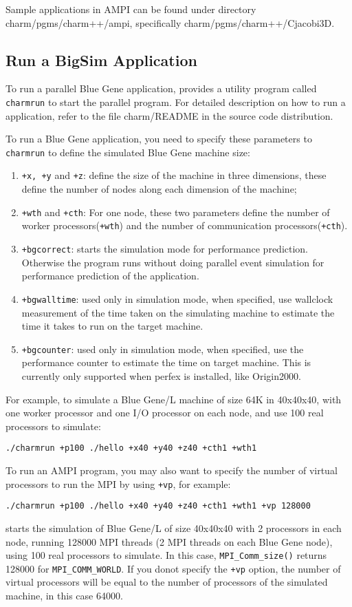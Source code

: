 Sample applications in AMPI can be found under directory
charm/pgms/charm++/ampi, specifically charm/pgms/charm++/Cjacobi3D.

\subsection{Run a BigSim Application}

To run a parallel Blue Gene application, \charmpp{} provides a utility program
called {\tt charmrun} to start the parallel program. 
For detailed description on how to run a \charmpp{} application, 
refer to the file charm/README in the source code distribution.

To run a Blue Gene application, you need to specify these parameters to 
{\tt charmrun} to define the simulated Blue Gene machine size:
\begin{enumerate}
\item {\tt +x, +y} and {\tt +z}:  define the size of the machine in three dimensions, these define the number of nodes along each dimension of the machine;
\item {\tt +wth} and {\tt +cth}:  For one node, these two parameters define the number of worker processors({\tt +wth}) and the number of communication processors({\tt +cth}).
\item {\tt +bgcorrect}: starts the simulation mode for performance prediction. Otherwise the program runs without doing parallel event simulation for performance prediction of the application.
\item {\tt +bgwalltime}: used only in simulation mode, when specified, use wallclock measurement of the time taken on the simulating machine to estimate the time it takes to run on the target machine.
\item {\tt +bgcounter}:  used only in simulation mode, when specified, use the performance counter to estimate the time on target machine. This is currently only supported when perfex is installed, like Origin2000.
\end{enumerate}

For example, to simulate a Blue Gene/L machine of size 64K in 40x40x40, with 
one worker processor and one I/O processor on each node, and use 100 
real processors to simulate:
\begin{verbatim}
./charmrun +p100 ./hello +x40 +y40 +z40 +cth1 +wth1
\end{verbatim}

To run an AMPI program, you may also want to specify the number of virtual 
processors to run the MPI by using {\tt +vp}, for example:
\begin{verbatim}
./charmrun +p100 ./hello +x40 +y40 +z40 +cth1 +wth1 +vp 128000
\end{verbatim}
starts the simulation of Blue Gene/L of size 40x40x40 with 2 processors 
in each node, running 128000 MPI threads (2 MPI threads on each Blue Gene node),
 using 100 real processors to simulate. In this case, {\tt MPI\_Comm\_size()}
returns 128000 for {\tt MPI\_COMM\_WORLD}. If you donot specify the {\tt +vp}
option, the number of virtual processors will be equal to the number of 
processors of the simulated machine, in this case 64000.


